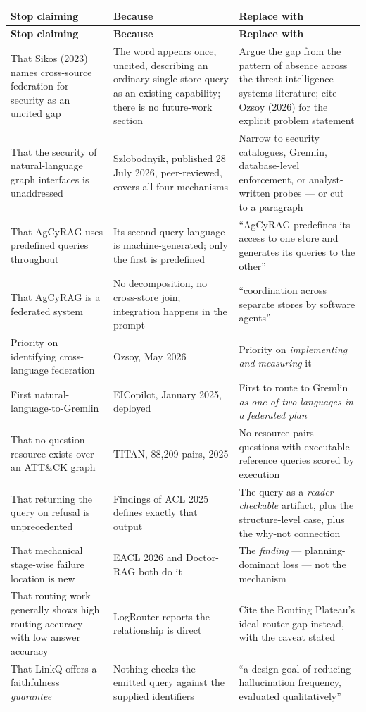 \documentclass[11pt,a4paper]{article}
\begin{document}
\begin{center}
\footnotesize
\begin{longtable}{@{}>{\RaggedRight}p{4.8cm}>{\RaggedRight}p{5.4cm}>{\RaggedRight}p{5.2cm}@{}}
\toprule
\textbf{Stop claiming} & \textbf{Because} & \textbf{Replace with} \\
\midrule
\endfirsthead
\toprule
\textbf{Stop claiming} & \textbf{Because} & \textbf{Replace with} \\
\midrule
\endhead
That Sikos (2023) names cross-source federation for security as an uncited gap & The word appears once, uncited, describing an ordinary single-store query as an existing capability; there is no future-work section & Argue the gap from the pattern of absence across the threat-intelligence systems literature; cite Ozsoy (2026) for the explicit problem statement \\
That the security of natural-language graph interfaces is unaddressed & Szlobodnyik, published 28 July 2026, peer-reviewed, covers all four mechanisms & Narrow to security catalogues, Gremlin, database-level enforcement, or analyst-written probes --- or cut to a paragraph \\
That AgCyRAG uses predefined queries throughout & Its second query language is machine-generated; only the first is predefined & ``AgCyRAG predefines its access to one store and generates its queries to the other'' \\
That AgCyRAG is a federated system & No decomposition, no cross-store join; integration happens in the prompt & ``coordination across separate stores by software agents'' \\
Priority on identifying cross-language federation & Ozsoy, May 2026 & Priority on \emph{implementing and measuring} it \\
First natural-language-to-Gremlin & EICopilot, January 2025, deployed & First to route to Gremlin \emph{as one of two languages in a federated plan} \\
That no question resource exists over an ATT\&CK graph & TITAN, 88{,}209 pairs, 2025 & No resource pairs questions with executable reference queries scored by execution \\
That returning the query on refusal is unprecedented & Findings of ACL 2025 defines exactly that output & The query as a \emph{reader-checkable} artifact, plus the structure-level case, plus the why-not connection \\
That mechanical stage-wise failure location is new & EACL 2026 and Doctor-RAG both do it & The \emph{finding} --- planning-dominant loss --- not the mechanism \\
That routing work generally shows high routing accuracy with low answer accuracy & LogRouter reports the relationship is direct & Cite the Routing Plateau's ideal-router gap instead, with the caveat stated \\
That LinkQ offers a faithfulness \emph{guarantee} & Nothing checks the emitted query against the supplied identifiers & ``a design goal of reducing hallucination frequency, evaluated qualitatively'' \\
\bottomrule
\end{longtable}
\end{center}
\end{document}
